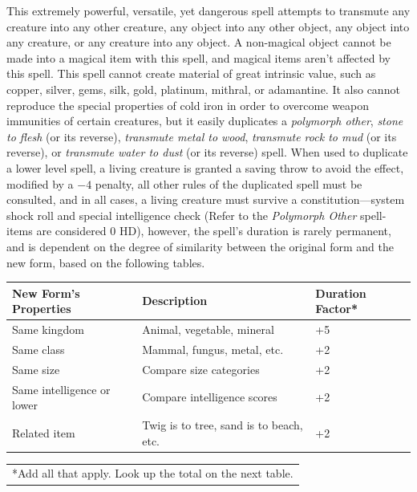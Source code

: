 \begin{multicols}{2}
This extremely powerful, versatile, yet dangerous spell attempts to transmute any creature into any other creature, any object into any other object, any object into any creature, or any creature into any object.  A non-magical object cannot be made into a magical item with this spell, and magical items aren't affected by this spell.  This spell cannot create material of great intrinsic value, such as copper, silver, gems, silk, gold, platinum, mithral, or adamantine.  It also cannot reproduce the special properties of cold iron in order to overcome weapon immunities of certain creatures, but it easily duplicates a \textit{polymorph other}, \textit{stone to flesh} (or its reverse), \textit{transmute metal to wood}, \textit{transmute rock to mud} (or its reverse), or \textit{transmute water to dust} (or its reverse) spell.  When used to duplicate a lower level spell, a living creature is granted a saving throw to avoid the effect, modified by a $-4$ penalty, all other rules of the duplicated spell must be consulted, and in all cases, a living creature must survive a constitution---system shock roll and special intelligence check (Refer to the \textit{Polymorph Other} spell- items are considered 0 HD), however, the spell's duration is rarely permanent, and is dependent on the degree of similarity between the original form and the new form, based on the following tables.

\noindent
\begin{tabular}{|p{}|p{}|p{}|}
\hline
New Form's Properties	& Description	& Duration Factor* \\
\hline\hline
\rowcolor[gray]{.9}Same kingdom	& Animal, vegetable, mineral	& +5 \\
Same class	& Mammal, fungus, metal, etc.	& +2 \\
\rowcolor[gray]{.9}Same size	& Compare size categories	& +2 \\
Same intelligence or lower	& Compare intelligence scores	& +2 \\
\rowcolor[gray]{.9}Related item	& Twig is to tree, sand is to beach, etc.	& +2 \\
\hline
\end{tabular}
\noindent\begin{tabular}{p{}}
*Add all that apply.  Look up the total on the next table. \\
\end{tabular}\vspace{.5em}


\end{multicols}

